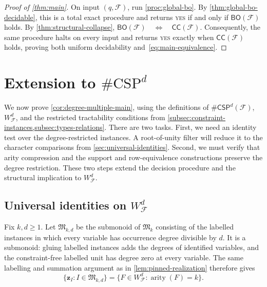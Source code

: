 \documentclass[11pt,letterpaper,onecolumn]{article}
\theoremstyle{plain}
\theoremstyle{definition}
\theoremstyle{remark}
\newcommand{\cF}{\mathcal F}
\newcommand{\CC}{\mathsf{CC}}
\newcommand{\BO}{\mathsf{BO}}
\newcommand{\CSPdeg}[2]{\mathsf{\#CSP}^{#1}(#2)}
\newcommand{\WFdeg}[1]{W_{\cF}^{#1}}
\newcommand{\zvec}[1]{\mathbf z_{#1}}
\newcommand{\InstMonoid}[1]{\mathfrak M_{#1}}
\newcommand{\YES}{\textnormal{\textsc{yes}}}
\DeclareMathOperator{\arity}{arity}
\begin{document}
\begin{proof}[Proof of \cref{thm:main}]
On input $(q,\cF)$, run \cref{proc:global-bo}.  By
\cref{thm:global-bo-decidable}, this is a total exact procedure and returns
\YES{} if and only if $\BO(\cF)$ holds.  By
\cref{thm:structural-collapse}, $\BO(\cF)\quad\Longleftrightarrow\quad\CC(\cF)$. Consequently, the same procedure halts on every input and returns
\YES{} exactly when $\CC(\cF)$ holds, proving both uniform
decidability and~\eqref{eq:main-equivalence}.
\end{proof}

\section{Extension to \texorpdfstring{$\#\mathrm{CSP}^{d}$}{degree-restricted counting CSP}}
\label{sec:degree-extension}

We now prove \cref{cor:degree-multiple-main}, using the definitions of
$\CSPdeg{d}{\cF}$, $\WFdeg{d}$, and the restricted tractability conditions
from \cref{subsec:constraint-instances,subsec:types-relations}.
There are two tasks.  First, we need an
identity test over the degree-restricted instances. A root-of-unity filter
will reduce it to the character comparisons from
\cref{sec:universal-identities}.  Second, we must verify that arity
compression and the support and row-equivalence constructions preserve
the degree restriction.  These two steps extend the decision procedure
and the structural implication to $\WFdeg{d}$.

\subsection{Universal identities on \texorpdfstring{$\WFdeg{d}$}{W(F, d)}}
\label{subsec:degree-multiple-identities}

Fix $k,d\ge1$.  Let $\mathfrak M_{k,d}$ be the submonoid of
$\InstMonoid{k}$ consisting of the labelled instances in which every
variable has occurrence degree divisible by $d$.  It is a submonoid:
gluing labelled instances adds the degrees of identified variables,
and the constraint-free labelled unit has degree zero at every variable.
The same labelling and summation argument as in
\cref{lem:pinned-realization} therefore gives
\begin{equation*}
  \{\zvec I:I\in\mathfrak M_{k,d}\}
  =\{F\in\WFdeg{d}:\arity(F)=k\}.
\end{equation*}
\end{document}
